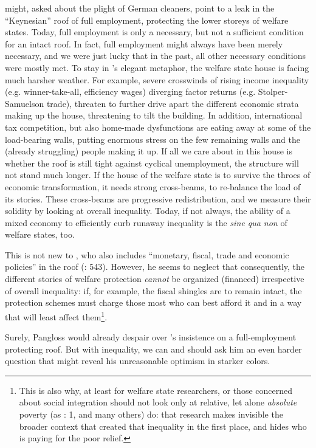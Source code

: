 \documentclass[11pt,a4paper,oneside,openright]{article}
\begin{document}
\begin{enumerate}
	\citeauthor{Offe2003} might, asked about the plight of German cleaners, point to a leak in the ``Keynesian'' roof of full employment, protecting the lower storeys of welfare states. Today, full employment is only a necessary, but not a sufficient condition for an intact roof. In fact, full employment might always have been merely necessary, and we were just lucky that in the past, all other necessary conditions were mostly met. To stay in \citeauthor{Offe2003}'s elegant metaphor, the welfare state house is facing much harsher weather. For example, severe crosswinds of rising income inequality (e.g. winner-take-all, efficiency wages) diverging factor returns (e.g. Stolper-Samuelson trade), threaten to further drive apart the different economic strata making up the house, threatening to tilt the building. In addition, international tax competition, but also home-made dysfunctions are eating away at some of the load-bearing walls, putting enormous stress on the few remaining walls and the (already struggling) people making it up. If all we care about in this house is whether the roof is still tight against cyclical unemployment, the structure will not stand much longer. If the house of the welfare state is to survive the throes of economic transformation, it needs strong cross-beams, to re-balance the load of its stories. These cross-beams are progressive redistribution, and we measure their solidity by looking at overall inequality. Today, if not always, the ability of a mixed economy to efficiently curb runaway inequality is the \emph{sine qua non} of welfare states, too. 
	
	This is not new to \cite{Offe2003}, who also includes ``monetary, fiscal, trade and economic policies'' in the roof (\citeyear{Offe2003}: 543). However, he seems to neglect that consequently, the different stories of welfare protection \emph{cannot} be organized (financed) irrespective of overall inequality: if, for example, the fiscal shingles are to remain intact, the protection schemes must charge those most who can best afford it and in a way that will least affect them\footnote{
		This is also why, at least for welfare state researchers, or those concerned about social integration should not look only at relative, let alone \emph{absolute} poverty (as \citealt{Grow2005}: 1, and many others) do: that research makes invisible the broader context that created that inequality in the first place, and hides who is paying for the poor relief.}. 
	
	Surely, Pangloss would already despair over \cite{Offe2003}'s insistence on a full-employment protecting roof. But with inequality, we can and should ask him an even harder question that might reveal his unreasonable optimism in starker colors.
	

\end{enumerate}
\end{document}
